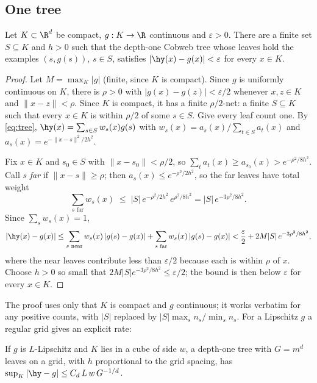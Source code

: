 \subsection{One tree}

\begin{theorem}\label{thm:univ-tree}
Let $K\subset\R^d$ be compact, $g:K\to\R$ continuous and $\varepsilon>0$.  There are a
finite set $S\subseteq K$ and $h>0$ such that the depth-one Cobweb tree whose leaves hold
the examples $(s,g(s))$, $s\in S$, satisfies $|\hy(x)-g(x)|<\varepsilon$ for every $x\in K$.
\end{theorem}

\begin{proof}
Let $M=\max_K|g|$ (finite, since $K$ is compact).  Since $g$ is uniformly continuous on
$K$, there is $\rho>0$ with $|g(x)-g(z)|<\varepsilon/2$ whenever $x,z\in K$ and
$\|x-z\|<\rho$.  Since $K$ is compact, it has a finite $\rho/2$-net: a finite $S\subseteq K$
such that every $x\in K$ is within $\rho/2$ of some $s\in S$.  Give every leaf count one.
By \eqref{eq:tree}, $\hy(x)=\sum_{s\in S}w_s(x)g(s)$ with
$w_s(x)=a_s(x)/\sum_{t\in S}a_t(x)$ and $a_s(x)=e^{-\|x-s\|^2/2h^2}$.

Fix $x\in K$ and $s_0\in S$ with $\|x-s_0\|<\rho/2$, so $\sum_ta_t(x)\ge a_{s_0}(x)>
e^{-\rho^2/8h^2}$.  Call $s$ \emph{far} if $\|x-s\|\ge\rho$; then $a_s(x)\le e^{-\rho^2/2h^2}$,
so the far leaves have total weight
\[
  \sum_{s\text{ far}}w_s(x)\;\le\;|S|\,e^{-\rho^2/2h^2}\,e^{\rho^2/8h^2}=|S|\,e^{-3\rho^2/8h^2}.
\]
Since $\sum_sw_s(x)=1$,
\[
  |\hy(x)-g(x)|\le\sum_{s\text{ near}}w_s(x)\,|g(s)-g(x)|+\sum_{s\text{ far}}w_s(x)\,|g(s)-g(x)|
  <\frac\varepsilon2+2M|S|\,e^{-3\rho^2/8h^2},
\]
where the near leaves contribute less than $\varepsilon/2$ because each is within $\rho$ of
$x$.  Choose $h>0$ so small that $2M|S|e^{-3\rho^2/8h^2}\le\varepsilon/2$; the bound is then
below $\varepsilon$ for every $x\in K$.
\end{proof}

The proof uses only that $K$ is compact and $g$ continuous; it works verbatim for any
positive counts, with $|S|$ replaced by $|S|\max_sn_s/\min_sn_s$.  For a Lipschitz $g$ a
regular grid gives an explicit rate:

\begin{proposition}\label{prop:rate}
If $g$ is $L$-Lipschitz and $K$ lies in a cube of side $w$, a depth-one tree with
$G=m^d$ leaves on a grid, with $h$ proportional to the grid spacing, has
$\sup_K|\hy-g|\le C_d\,L\,w\,G^{-1/d}$.
\end{proposition}

